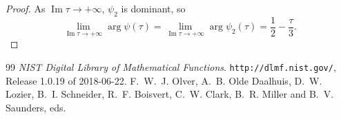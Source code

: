\documentclass[10pt,a4paper]{amsart}
\newcommand{\im}{\operatorname{Im}}
\begin{document}
\begin{proof}
		As $\im \tau \to +\infty$, $\psi_2$ is dominant, so
		\[
			\lim_{\im\tau \to +\infty} \arg \psi(\tau) =
			\lim_{\im\tau \to +\infty} \arg \psi_2(\tau) = \frac{1}{2} - \frac{\tau}{3}.
		\]
	\end{proof}

\begin{thebibliography}{99}
 {\it NIST Digital Library of Mathematical Functions}. \newblock \texttt{http://dlmf.nist.gov/}, Release 1.0.19 of 2018-06-22. \newblock F.~W.~J. Olver, A.~B. {Olde Daalhuis}, D.~W. Lozier, B.~I. Schneider, R.~F. Boisvert, C.~W. Clark, B.~R. Miller and B.~V. Saunders, eds.
\end{thebibliography}
\end{document}
